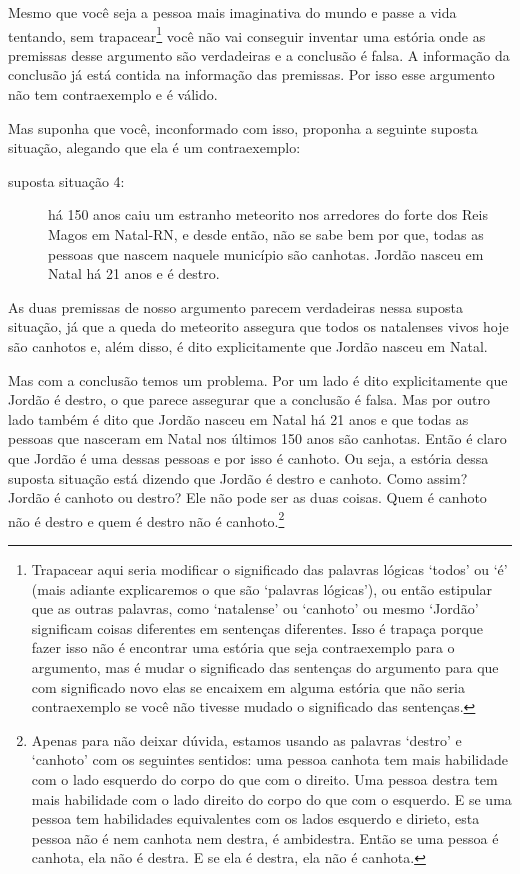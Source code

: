 Mesmo que você seja a pessoa mais imaginativa do mundo e passe a vida tentando, sem trapacear\footnote{
	Trapacear aqui seria modificar o significado das palavras lógicas `todos' ou `é' (mais adiante explicaremos o que são `palavras lógicas'), ou então estipular que as outras palavras, como `natalense' ou `canhoto' ou mesmo `Jordão' significam coisas diferentes em sentenças diferentes.
	Isso é trapaça porque fazer isso não é encontrar uma estória que seja contraexemplo para o argumento, mas é mudar o significado das sentenças do argumento para que com significado novo elas se encaixem em alguma estória que não seria contraexemplo se você não tivesse mudado o significado das sentenças.}
você não vai conseguir inventar uma estória onde as premissas desse argumento são verdadeiras e a conclusão é falsa.
A informação da conclusão já está contida na informação das premissas.
Por isso esse argumento não tem contraexemplo e é válido.

Mas suponha que você, inconformado com isso, proponha a seguinte suposta situação, alegando que ela é um contraexemplo:
\begin{description}
	\item[suposta situação 4:] há 150 anos caiu um estranho meteorito nos arredores do forte dos Reis Magos em Natal-RN, e desde então, não se sabe bem por que, todas as pessoas que nascem naquele município são canhotas. Jordão nasceu em Natal há 21 anos e é destro.
\end{description} 
As duas premissas de nosso argumento parecem verdadeiras nessa suposta situação, já que a queda do meteorito assegura que todos os natalenses vivos hoje são canhotos e, além disso, é dito explicitamente que Jordão nasceu em Natal.

Mas com a conclusão temos um problema.
Por um lado é dito explicitamente que Jordão é destro, o que parece assegurar que a conclusão é falsa.
Mas por outro lado também é dito que Jordão nasceu em Natal há 21 anos e que todas as pessoas que nasceram em Natal nos últimos 150 anos são canhotas.
Então é claro que Jordão é uma dessas pessoas e por isso é canhoto.
Ou seja, a estória dessa suposta situação está dizendo que Jordão é destro e canhoto.
Como assim?
Jordão é canhoto ou destro?
Ele não pode ser as duas coisas.
Quem é canhoto não é destro e quem é destro não é canhoto.\footnote{
	Apenas para não deixar dúvida, estamos usando as palavras `destro' e `canhoto' com os seguintes sentidos: uma pessoa canhota tem mais habilidade com o lado esquerdo do corpo do que com o direito. Uma pessoa destra tem mais habilidade com o lado direito do corpo do que com o esquerdo. E se uma pessoa tem habilidades equivalentes com os lados esquerdo e dirieto, esta pessoa não é nem canhota nem destra, é ambidestra. Então se uma pessoa é canhota, ela não é destra. E se ela é destra, ela não é canhota.}

